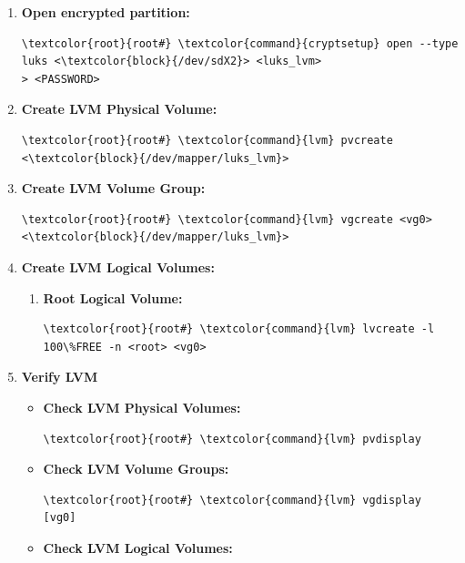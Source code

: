 \documentclass[10pt, a4paper, onecolumn, oneside, titlepage, openany]{book}
\begin{document}
\begin{enumerate}
    \item \textbf{Open encrypted partition:}
\begin{Verbatim}[commandchars=\\\{\}]
\textcolor{root}{root#} \textcolor{command}{cryptsetup} open --type luks <\textcolor{block}{/dev/sdX2}> <luks_lvm>
> <PASSWORD>
\end{Verbatim}
    \item \textbf{Create LVM Physical Volume:}
\begin{Verbatim}[commandchars=\\\{\}]
\textcolor{root}{root#} \textcolor{command}{lvm} pvcreate <\textcolor{block}{/dev/mapper/luks_lvm}>
\end{Verbatim}
    \item \textbf{Create LVM Volume Group:}
\begin{Verbatim}[commandchars=\\\{\}]
\textcolor{root}{root#} \textcolor{command}{lvm} vgcreate <vg0> <\textcolor{block}{/dev/mapper/luks_lvm}>
\end{Verbatim}
    \item \textbf{Create LVM Logical Volumes:}
    \begin{enumerate}
        \item \textbf{Root Logical Volume:}
\begin{Verbatim}[commandchars=\\\{\}]
\textcolor{root}{root#} \textcolor{command}{lvm} lvcreate -l 100\%FREE -n <root> <vg0>
\end{Verbatim}
    \end{enumerate}
    \item \textbf{Verify LVM}
    \begin{itemize}
        \item \textbf{Check LVM Physical Volumes:}
\begin{Verbatim}[commandchars=\\\{\}]
\textcolor{root}{root#} \textcolor{command}{lvm} pvdisplay
\end{Verbatim}
        \item \textbf{Check LVM Volume Groups:}
\begin{Verbatim}[commandchars=\\\{\}]
\textcolor{root}{root#} \textcolor{command}{lvm} vgdisplay [vg0]
\end{Verbatim}
        \item \textbf{Check LVM Logical Volumes:}
\begin{Verbatim}[commandchars=\\\{\}]

\end{Verbatim}
\end{itemize}
\end{enumerate}
\end{document}
